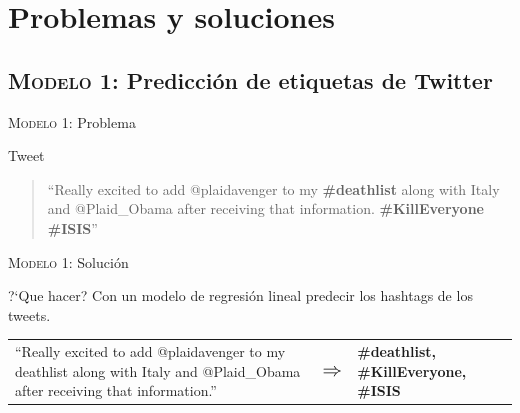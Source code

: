 \documentclass[10pt]{beamer}
\begin{document}

\section{Problemas y soluciones}

\subsection{\textsc{Modelo 1:} Predicción de etiquetas de Twitter}

\begin{frame}{\textsc{Modelo 1:} Problema}
  \begin{alertblock}{Tweet}
    \begin{quote}
    ``Really excited to add @plaidavenger to my \textbf{\#deathlist} along with Italy and @Plaid\_Obama after receiving that information. \textbf{\#KillEveryone} \textbf{\#ISIS}''
    \end{quote}
  \end{alertblock}
\end{frame}

\begin{frame}{\textsc{Modelo 1:} Solución}
  \begin{alertblock}{?`Que hacer?}
    Con un modelo de regresión lineal predecir los hashtags de los tweets.
  \end{alertblock}
  \vspace{2em}
  
  \begin{tabular}{p{} p{} p{}}
    ``Really excited to add @plaidavenger to my deathlist along with Italy and @Plaid\_Obama after receiving that information.'' & $\mathlarger{\mathlarger{\mathlarger{\Rightarrow}}}$ & \textbf{\#deathlist, \#KillEveryone, \#ISIS}
    \end{tabular}
\end{frame}
\end{document}
